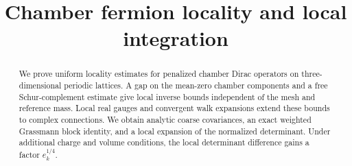 \documentclass[11pt,letterpaper,reqno]{amsart}
\title[Chamber fermion locality and local integration]
 {Chamber fermion locality and local integration}
\date{}
\begin{document}
\begin{abstract}
We prove uniform locality estimates for penalized chamber Dirac
operators on three-dimensional periodic lattices. A gap on the
mean-zero chamber components and a free Schur-complement estimate
give local inverse bounds independent of the mesh and reference
mass. Local real gauges and convergent walk expansions extend these
bounds to complex connections. We obtain analytic coarse covariances,
an exact weighted Grassmann block identity, and a local expansion of
the normalized determinant. Under additional charge and volume
conditions, the local determinant difference gains a factor
\(e_k^{1/4}\).
\end{abstract}
\maketitle
\tableofcontents






\appendix

\printbibliography
\end{document}
